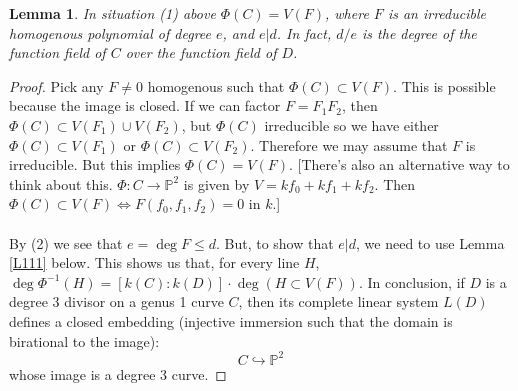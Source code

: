 \documentclass{article}
\newcommand{\Proj}{\mathbb{P}}
\theoremstyle{plain}
\newtheorem{lem}[thm]{Lemma}
\theoremstyle{definition}
\theoremstyle{remark}
\begin{document}
\begin{lem}
\label{L110}
In situation (1) above $\Phi(C) = V(F)$, where $F$ is an irreducible homogenous polynomial of degree $e$, and $e|d$. In fact, $d/e$ is the degree of the function field of $C$ over the function field of $D$.
\end{lem}
\begin{proof}
Pick any $F\neq 0$ homogenous such that $\Phi(C) \subset V(F)$. This is possible because the image is closed. If we can factor $F = F_1 F_2$, then $\Phi(C) \subset V(F_1) \cup V(F_2)$, but $\Phi(C)$ irreducible so we have either $\Phi(C) \subset V(F_1)$ or $\Phi(C) \subset V(F_2)$. Therefore we may assume that $F$ is irreducible. But this implies $\Phi(C) = V(F)$. [There's also an alternative way to think about this. $\Phi : C \to \Proj^2$ is given by $V = k f_0 + kf_1 + kf_2$. Then $\Phi(C) \subset V(F) \Leftrightarrow F(f_0, f_1, f_2) = 0$ in $k$.]
\\
\\
By (2) we see that $e = \deg F \leq d$. But, to show that $e|d$, we need to use Lemma \ref{L111} below. This shows us that, for every line $H$, $\deg \Phi^{-1}(H) = [k(C) : k(D)] \cdot \deg(H\subset V(F))$. In conclusion, if $D$ is a degree 3 divisor on a genus 1 curve $C$, then its complete linear system $L(D)$ defines a closed embedding (injective immersion such that the domain is birational to the image):
\[      C \hookrightarrow \Proj^2      \]
whose image is a degree 3 curve.
\end{proof}
\end{document}
